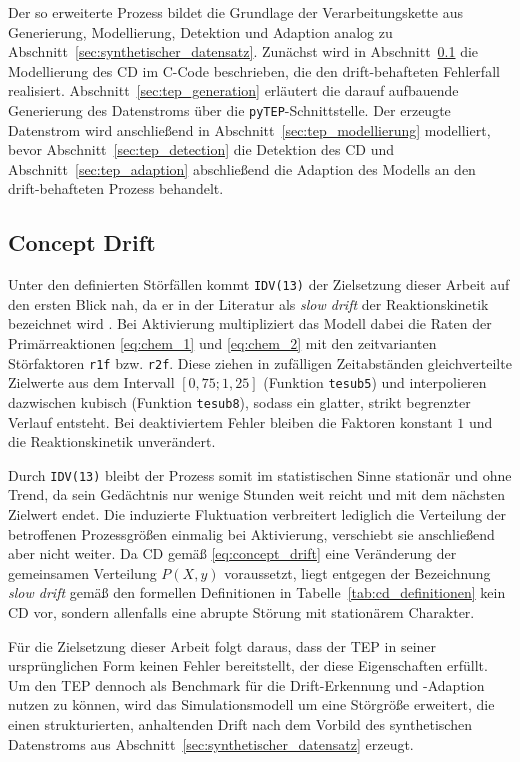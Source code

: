 %
Der so erweiterte Prozess bildet die Grundlage der Verarbeitungskette aus Generierung, Modellierung, Detektion und Adaption analog zu Abschnitt~\ref{sec:synthetischer_datensatz}. Zunächst wird in Abschnitt~\ref{sec:tep_drift} die Modellierung des \ac{CD} im C-Code beschrieben, die den drift-behafteten Fehlerfall realisiert. Abschnitt~\ref{sec:tep_generation} erläutert die darauf aufbauende Generierung des Datenstroms über die \texttt{pyTEP}-Schnittstelle. Der erzeugte Datenstrom wird anschließend in Abschnitt~\ref{sec:tep_modellierung} modelliert, bevor Abschnitt~\ref{sec:tep_detection} die Detektion des \ac{CD} und Abschnitt~\ref{sec:tep_adaption} abschließend die Adaption des Modells an den drift-behafteten Prozess behandelt. \par
%
\subsection{Concept Drift} \label{sec:tep_drift}
%
Unter den definierten Störfällen kommt \texttt{IDV(13)} der Zielsetzung dieser Arbeit auf den ersten Blick nah, da er in der Literatur als \emph{slow drift} der Reaktionskinetik bezeichnet wird \cite{downs.1993}. Bei Aktivierung multipliziert das Modell dabei die Raten der Primärreaktionen \eqref{eq:chem_1} und \eqref{eq:chem_2} mit den zeitvarianten Störfaktoren \texttt{r1f} bzw. \texttt{r2f}. Diese ziehen in zufälligen Zeitabständen gleichverteilte Zielwerte aus dem Intervall $[0{,}75; 1{,}25]$ (Funktion \texttt{tesub5}) und interpolieren dazwischen kubisch (Funktion \texttt{tesub8}), sodass ein glatter, strikt begrenzter Verlauf entsteht. Bei deaktiviertem Fehler bleiben die Faktoren konstant $1$ und die Reaktionskinetik unverändert. \par
Durch \texttt{IDV(13)} bleibt der Prozess somit im statistischen Sinne stationär und ohne Trend, da sein Gedächtnis nur wenige Stunden weit reicht und mit dem nächsten Zielwert endet. Die induzierte Fluktuation verbreitert lediglich die Verteilung der betroffenen Prozessgrößen einmalig bei Aktivierung, verschiebt sie anschließend aber nicht weiter. Da \ac{CD} gemäß \eqref{eq:concept_drift} eine Veränderung der gemeinsamen Verteilung $P(X, y)$ voraussetzt, liegt entgegen der Bezeichnung \emph{slow drift} gemäß den formellen Definitionen in Tabelle~\ref{tab:cd_definitionen} kein \ac{CD} vor, sondern allenfalls eine abrupte Störung mit stationärem Charakter. \par
Für die Zielsetzung dieser Arbeit folgt daraus, dass der \ac{TEP} in seiner ursprünglichen Form keinen Fehler bereitstellt, der diese Eigenschaften erfüllt. Um den \ac{TEP} dennoch als Benchmark für die Drift-Erkennung und -Adaption nutzen zu können, wird das Simulationsmodell um eine Störgröße erweitert, die einen strukturierten, anhaltenden Drift nach dem Vorbild des synthetischen Datenstroms aus Abschnitt~\ref{sec:synthetischer_datensatz} erzeugt. \par
